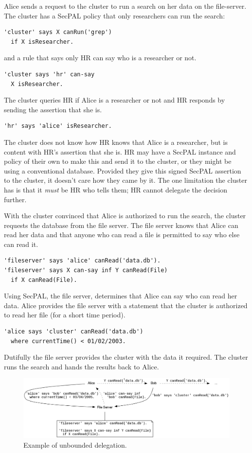 \documentclass[thesis.tex]{subfiles}
\begin{document}
Alice sends a request to the cluster to run a search on her data on the file-server.
The cluster has a SecPAL policy that only researchers can run the search:
\begin{lstlisting}
'cluster' says X canRun('grep')
  if X isResearcher.
\end{lstlisting}
and a rule that says only HR can say who is a researcher or not.
\begin{lstlisting}
'cluster says 'hr' can-say
  X isResearcher.
\end{lstlisting}
The cluster queries HR if Alice is a researcher or not and HR responds by sending the assertion that she is.
\begin{lstlisting}
'hr' says 'alice' isResearcher.
\end{lstlisting}
The cluster does not know how HR knows that Alice is a researcher, but
is content with HR's assertion that she is.  HR may have a SecPAL
instance and policy of their own to make this and send it to the
cluster, or they might be using a conventional database.  Provided
they give this signed SecPAL assertion to the cluster, it doesn't care
how they came by it.  The one limitation the cluster has is that it
\emph{must} be HR who tells them; HR cannot delegate the decision
further.

With the cluster convinced that Alice is authorized to run the search,
the cluster requests the database from the file server.  The file
server knows that Alice can read her data and that anyone who can read
a file is permitted to say who else can read it.
\begin{lstlisting}
'fileserver' says 'alice' canRead('data.db').
'fileserver' says X can-say inf Y canRead(File)
  if X canRead(File).
\end{lstlisting}
Using SecPAL, the file server, determines that Alice can say who can
read her data.  Alice provides the file server with a statement that
the cluster is authorized to read her file (for a short time
period).
\begin{lstlisting}
'alice says 'cluster' canRead('data.db')
  where currentTime() < 01/02/2003.
\end{lstlisting}
Dutifully the file server provides the cluster with the data
it required.  The cluster runs the search and hands the results back to Alice.

\begin{figure}
  \centering
  \includegraphics[width=\textwidth]{figures/secpal-example-delegation.png}
  \caption{Example of unbounded delegation.}
  \label{fig:unbounded-example}
\end{figure}
\end{document}

